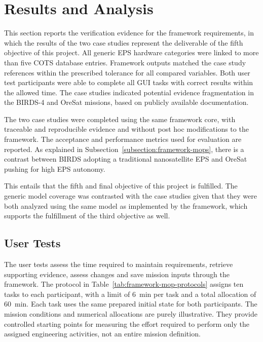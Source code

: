 \chapter{Results and Analysis}
\label{ch:results}

This section reports the verification evidence for the framework requirements, in which the results of the two case studies represent the deliverable of the fifth objective of this project.
All generic EPS hardware categories were linked to more than five COTS database entries.
Framework outputs matched the case study references within the prescribed tolerance for all compared variables.
Both user test participants were able to complete all GUI tasks with correct results within the allowed time.
The case studies indicated potential evidence fragmentation in the BIRDS-4 and OreSat missions, based on publicly available documentation.

The two case studies were completed using the same framework core, with traceable and reproducible evidence and without post hoc modifications to the framework. The acceptance and performance metrics used for evaluation are reported.
As explained in Subsection~\ref{subsection:framework-mops}, there is a contrast between BIRDS adopting a traditional nanosatellite EPS and OreSat pushing for high EPS autonomy.

This entails that the fifth and final objective of this project is fulfilled.
The generic model coverage was contrasted with the case studies given that they were both analyzed using the same model as implemented by the framework, which supports the fulfillment of the third objective as well.

\section{User Tests}
\label{section:user-trial-results}

The user tests assess the time required to maintain requirements, retrieve supporting evidence, assess changes and save mission inputs through the framework.
The protocol in Table~\ref{tab:framework-mop-protocols} assigns ten tasks to each participant, with a limit of 6~min per task and a total allocation of 60~min.
Each task uses the same prepared initial state for both participants.
The mission conditions and numerical allocations are purely illustrative.
They provide controlled starting points for measuring the effort required to perform only the assigned engineering activities, not an entire mission definition.

